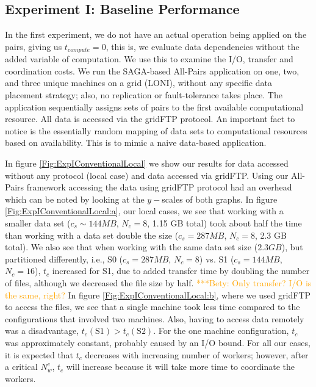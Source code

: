 \documentclass{rspublic}
\newcommand{\betynote}[1]{ {\textcolor{orange} { ***Bety: #1 }}}
\begin{document}
\subsection{Experiment I: Baseline Performance}\label{Sec:gridFTPExp}
In the first experiment, we do not have an actual operation being
applied on the pairs, giving us $t_{compute}=0$, this is, we evaluate
data dependencies without the added variable of computation. We use
this to examine the I/O, transfer and coordination costs. We run the
SAGA-based All-Pairs application on one, two, and three unique machines
on a grid (LONI), without any specific data placement strategy; also,
no replication or fault-tolerance takes place. The application
sequentially assigns sets of pairs to the first available computational
resource. All data is accessed via the gridFTP protocol. An important
fact to notice is the essentially random mapping of data sets to
computational resources based on availability. This is to mimic a naive
data-based application. 

In figure \ref{Fig:ExpIConventionalLocal} we show our results
for data accessed without any protocol (local case) and data accessed
via gridFTP. Using our All-Pairs
framework accessing the data using gridFTP protocol had an overhead
which can be noted by looking at the $y-$scales of both graphs. In figure
\ref{Fig:ExpIConventionalLocal:a}, our local cases, we see that working
with a smaller data set ($c_s \sim 144MB$, $N_c = 8$, 1.15 GB total)
took about half the time than working with a data set double the size
($c_s = 287MB$, $N_c = 8$, 2.3 GB total). We also see that when working
with the same data set size ($2.3 GB$), but partitioned differently,
i.e., S0 ($c_s = 287MB$, $N_c = 8$) vs. S1 ($c_s = 144MB$, $N_c = 16$),
$t_c$ increased for S1, due to added transfer time by doubling the
number of files, although we decreased the file size by half.
\betynote{Only transfer? I/O is the same, right?}In figure
\ref{Fig:ExpIConventionalLocal:b}, where we used gridFTP to access the
files, we see that a single machine took less time compared to the
configurations that involved two machines. Also, having to access data
remotely was a disadvantage, $t_c(\mbox{S1}) > t_c(\mbox{S2})$. For the
one machine configuration, $t_c$ was approximately constant, probably
caused by an I/O bound. For all our cases, it is expected that $t_c$
decreases with increasing number of workers; however, after a critical
$N^c_w$, $t_c$ will increase because it will take more time to
coordinate the workers.
\end{document}
